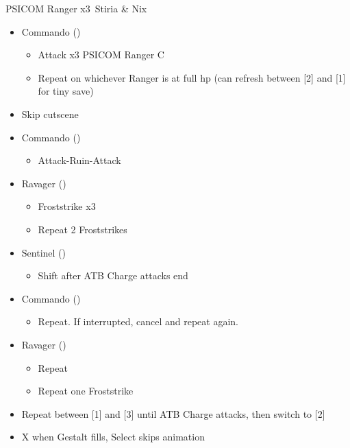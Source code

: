 \begin{paracol}{2}

\switchcolumn*


\renewcommand{\first}{[1] Commando (\com)}
\renewcommand{\second}{[2] Sentinel (\sen)}
\renewcommand{\third}{[3] Ravager (\rav)}

\begin{battle}{PSICOM Ranger x3\, Stiria \& Nix}
	\begin{itemize}
		\item \first
		      \begin{itemize}
			      \item Attack x3 PSICOM Ranger C
			      \item Repeat on whichever Ranger is at full hp (can refresh between [2] and [1] for tiny save)
		      \end{itemize}
		\item Skip cutscene
		\item \first
		      \begin{itemize}
			      \item Attack-Ruin-Attack
		      \end{itemize}
		\item \third
		      \begin{itemize}
			      \item Froststrike x3
			      \item Repeat 2 Froststrikes
		      \end{itemize}
		\item \second
		      \begin{itemize}
			      \item Shift after ATB Charge attacks end
		      \end{itemize}
		\item \first
		      \begin{itemize}
			      \item Repeat. If interrupted, cancel and repeat again.
		      \end{itemize}
		\item \third
		      \begin{itemize}
			      \item Repeat
			      \item Repeat one Froststrike
		      \end{itemize}
		\item Repeat between [1] and [3] until ATB Charge attacks, then switch to [2]
		\item X when Gestalt fills, Select skips animation
	\end{itemize}
	 
\end{battle}


\end{paracol}

